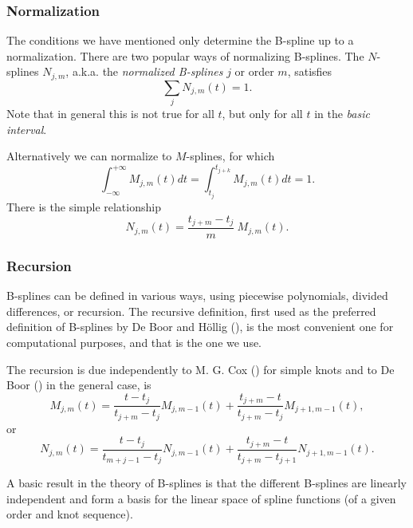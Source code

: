 \documentclass[
  12pt,
  letterpaper,
  DIV=11,
  numbers=noendperiod]{scrreprt}
\theoremstyle{remark}
\begin{document}
\subsubsection{Normalization}\label{mathbnormalize}

The conditions we have mentioned only determine the B-spline up to a
normalization. There are two popular ways of normalizing B-splines. The
\(N\)-splines \(N_{j,m}\), a.k.a. the \emph{normalized B-splines} \(j\)
or order \(m\), satisfies \begin{equation}\label{E:nsum}
\sum_{j}N_{j,m}(t)=1.
\end{equation} Note that in general this is not true for all \(t\), but
only for all \(t\) in the \emph{basic interval}.

Alternatively we can normalize to \(M\)-splines, for which
\begin{equation}\label{E:mint}
\int_{-\infty}^{+\infty}M_{j,m}(t)dt=\int_{t_j}^{t_{j+k}}M_{j,m}(t)dt=1.
\end{equation} There is the simple relationship
\begin{equation}\label{E:NM}
N_{j,m}(t)=\frac{t_{j+m}-t_j}{m}\ M_{j,m}(t).
\end{equation}

\subsubsection{Recursion}\label{mathbrecursion}

B-splines can be defined in various ways, using piecewise polynomials,
divided differences, or recursion. The recursive definition, first used
as the preferred definition of B-splines by De Boor and Höllig
(), is the most convenient one for
computational purposes, and that is the one we use.

The recursion is due independently to M. G. Cox
() for simple knots and to De Boor
() in the general case, is
\begin{equation}\label{E:Mspline}
M_{j,m}(t)=\frac{t-t_j}{t_{j+m}-t_j}M_{j,m-1}(t)+\frac{t_{j+m}-t}{t_{j+m}-t_j}M_{j+1,m-1}(t),
\end{equation} or \begin{equation}\label{E:Nspline}
N_{j,m}(t)=\frac{t-t_j}{t_{m+j-1}-t_j}N_{j,m-1}(t)+\frac{t_{j+m}-t}{t_{j+m}-t_{j+1}}N_{j+1,m-1}(t).
\end{equation}

A basic result in the theory of B-splines is that the different
B-splines are linearly independent and form a basis for the linear space
of spline functions (of a given order and knot sequence).
\end{document}
